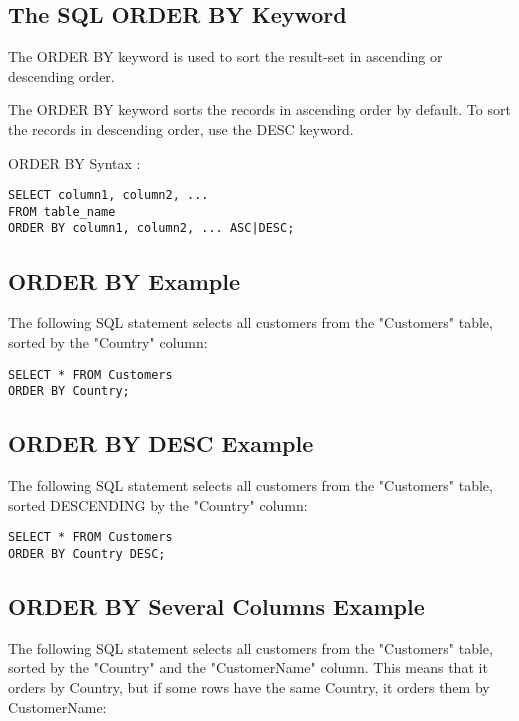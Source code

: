 \documentclass[a4paper,12pt]{article}
\begin{document}
\subsection{The SQL ORDER BY Keyword}

The ORDER BY keyword is used to sort the result-set in ascending or descending order.

The ORDER BY keyword sorts the records in ascending order by default. To sort the records in descending order, use the DESC keyword.



ORDER BY Syntax :

\begin{lstlisting}
SELECT column1, column2, ...
FROM table_name
ORDER BY column1, column2, ... ASC|DESC;
\end{lstlisting}


\subsection{ORDER BY Example}

The following SQL statement selects all customers from the "Customers" table, sorted by the "Country" column:

\begin{lstlisting}
SELECT * FROM Customers
ORDER BY Country;
\end{lstlisting}


\subsection{ORDER BY DESC Example}

The following SQL statement selects all customers from the "Customers" table, sorted DESCENDING by the "Country" column:

\begin{lstlisting}
SELECT * FROM Customers
ORDER BY Country DESC;
\end{lstlisting}


\subsection{ORDER BY Several Columns Example}

The following SQL statement selects all customers from the "Customers" table, sorted by the "Country" and the "CustomerName" column. This means that it orders by Country, but if some rows have the same Country, it orders them by CustomerName:
\end{document}
